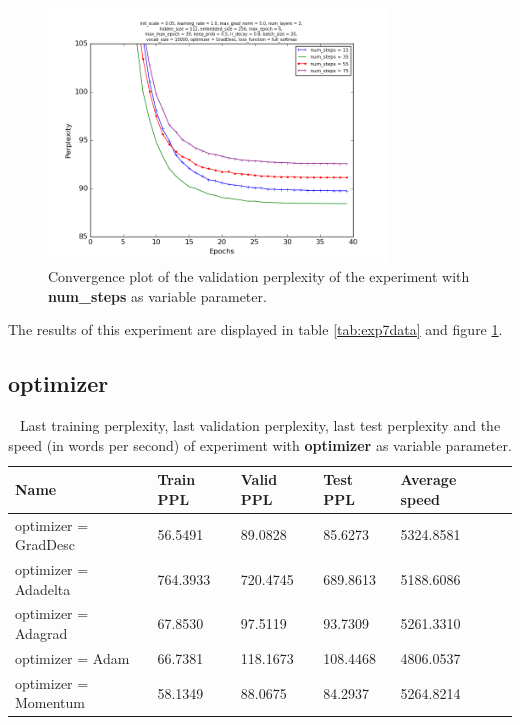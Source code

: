 \documentclass[10pt,a4paper,titlepage]{article}
\begin{document}
\begin{figure}[H]
	\begin{center}
		\includegraphics[width=0.80\textwidth]{Figures/numstepsperf.png}
		\caption{Convergence plot of the validation perplexity of the experiment with \textbf{num\_steps} as variable parameter. }
		\label{fig:exp7perf}
	\end{center}	
\end{figure}

The results of this experiment are displayed in table \ref{tab:exp7data} and figure \ref{fig:exp7perf}.

\newpage

\subsection{optimizer}

\begin{table}[H]
\centering
\caption{Last training perplexity, last validation perplexity, last test perplexity and the speed (in words per second) of experiment with \textbf{optimizer} as variable parameter.}
\label{tab:exp8data}
\begin{tabular}{|l|l|l|l|l|l|}
\hline
{\small Name} & {\small Train PPL} & {\small Valid PPL} & {\small Test PPL} & {\small Average speed}\\ \hline
optimizer = GradDesc                          & 56.5491    & 89.0828    & 85.6273    & 5324.8581  \\ \hline
optimizer = Adadelta                          & 764.3933   & 720.4745   & 689.8613   & 5188.6086  \\ \hline
optimizer = Adagrad                           & 67.8530    & 97.5119    & 93.7309    & 5261.3310  \\ \hline
optimizer = Adam                              & 66.7381    & 118.1673   & 108.4468   & 4806.0537  \\ \hline
optimizer = Momentum                          & 58.1349    & 88.0675    & 84.2937    & 5264.8214  \\ \hline
\end{tabular}
\end{table}
\end{document}
